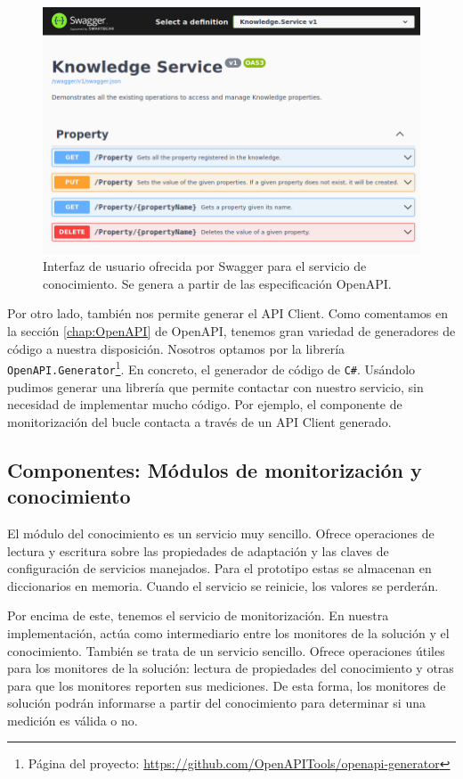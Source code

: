 \begin{figure}[htb]
  \centering
  \includegraphics[scale=1.5]{cap_implementacion/images/swagger-knowledge-ui}
  \caption{Interfaz de usuario ofrecida por Swagger para el servicio de conocimiento. Se genera a partir de las especificación OpenAPI.}
  \label{fig:swagger-knowledge-ui}
\end{figure}

Por otro lado, también nos permite generar el API Client. Como comentamos en la sección \ref{chap:OpenAPI} de OpenAPI, tenemos gran variedad de generadores de código a nuestra disposición. Nosotros optamos por la librería \texttt{OpenAPI.Generator}\footnote{Página del proyecto: \url{https://github.com/OpenAPITools/openapi-generator}}. En concreto, el generador de código de \verb|C#|. Usándolo pudimos generar una librería que permite contactar con nuestro servicio, sin necesidad de implementar mucho código. Por ejemplo, el componente de monitorización del bucle contacta a través de un API Client generado.

\subsection{Componentes: Módulos de monitorización y conocimiento}

El módulo del conocimiento es un servicio muy sencillo. Ofrece operaciones de lectura y escritura sobre las propiedades de adaptación y las claves de configuración de servicios manejados. Para el prototipo estas se almacenan en diccionarios en memoria. Cuando el servicio se reinicie, los valores se perderán.

Por encima de este, tenemos el servicio de monitorización. En nuestra implementación, actúa como intermediario entre los monitores de la solución y el conocimiento. También se trata de un servicio sencillo. Ofrece operaciones útiles para los monitores de la solución: lectura de propiedades del conocimiento y otras para que los monitores reporten sus mediciones. De esta forma, los monitores de solución podrán informarse a partir del conocimiento para determinar si una medición es válida o no.

